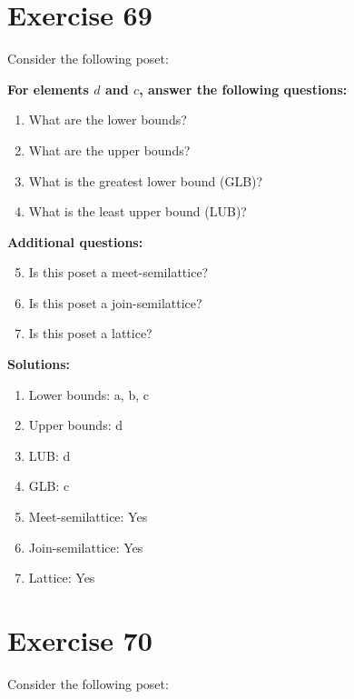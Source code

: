 \documentclass{article}
\begin{document}
\section*{Exercise 69}
Consider the following poset:
\begin{center}
\end{center}

    \textbf{For elements $d$ and $c$, answer the following questions:}
\begin{enumerate}
    \item What are the lower bounds?
    \item What are the upper bounds?
    \item What is the greatest lower bound (GLB)?
    \item What is the least upper bound (LUB)?
\end{enumerate}
    \hspace*{3ex} \textbf{Additional questions:}
\begin{enumerate}
    \setcounter{enumi}{4}
    \item Is this poset a meet-semilattice?
    \item Is this poset a join-semilattice?
    \item Is this poset a lattice?
\end{enumerate}

\textbf{Solutions:}
\begin{enumerate}
    \item Lower bounds: {a, b, c}
    \item Upper bounds: {d}
    \item LUB: d
    \item GLB: c
    \item Meet-semilattice: Yes
    \item Join-semilattice: Yes
    \item Lattice: Yes
\end{enumerate}
\newpage
\section*{Exercise 70}
Consider the following poset:
\begin{center}
\end{center}
\end{document}
